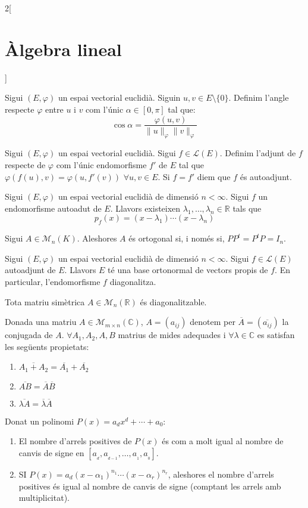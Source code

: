 \documentclass[class=article,10pt,crop=false]{standalone}
\begin{document}
\begin{multicols}{2}[\section{Àlgebra lineal}]
\begin{definition}
Sigui $(E,\varphi)$ un espai vectorial euclidià. Siguin $u,v\in E\setminus\{0\}$. Definim l'angle respecte $\varphi$ entre $u$ i $v$ com l'únic $\alpha\in[0,\pi]$ tal que: $$\cos{\alpha}=\frac{\varphi(u,v)}{\|u\|_\varphi\|v\|_\varphi}$$
\end{definition}
\begin{definition}
Sigui $(E,\varphi)$ un espai vectorial euclidià. Sigui $f\in\mathcal{L}(E)$. Definim l'adjunt de $f$ respecte de $\varphi$ com l'únic endomorfisme $f'$ de $E$ tal que $\varphi(f(u),v)=\varphi(u,f'(v))$ $\forall u,v\in E$. Si $f=f'$ diem que $f$ és autoadjunt. 
\end{definition}
\begin{lemma}
Sigui $(E,\varphi)$ un espai vectorial euclidià de dimensió $n<\infty$. Sigui $f$ un endomorfisme autoadut de $E$. Llavors existeixen $\lambda_1,\ldots,\lambda_n\in\mathbb{R}$ tals que $$p_f(x)=(x-\lambda_1 )\cdots(x-\lambda_n)$$
\end{lemma}
\begin{definition}
Sigui $A\in\mathcal{M}_n(K)$. Aleshores $A$ és ortogonal si, i només si, $PP^t=P^tP=I_n$.
\end{definition}
\begin{theorem}
Sigui $(E,\varphi)$ un espai vectorial euclidià de dimensió $n<\infty$. Sigui $f\in\mathcal{L}(E)$ autoadjunt de $E$. Llavors $E$ té una base ortonormal de vectors propis de $f$. En particular, l’endomorfisme $f$ diagonalitza.
\end{theorem}
\begin{corollary}
Tota matriu simètrica $A\in\mathcal{M}_n(\mathbb{R})$ és diagonalitzable.
\end{corollary}
\begin{definition}
Donada una matriu $A\in\mathcal{M}_{m\times n}(\mathbb{C})$, $A=(a_{ij})$ denotem per $\overline{A}=(\overline{a_{ij}})$ la conjugada de $A$. $\forall A_1,A_2,A,B$ matrius de mides adequades i $\forall\lambda\in\mathbb{C}$ es satisfan les següents propietats:
\begin{enumerate}
    \item $\overline{A_1+A_2}=\overline{
    A_1}+\overline{A_2}$
    \item $\overline{AB}=\overline{
    A}\overline{B}$
    \item $\overline{\lambda A}=\overline{\lambda}\overline{A}$
\end{enumerate}
\end{definition}
\begin{theorem}
Donat un polinomi $P(x)=a_dx^d+\cdots+a_0$:
\begin{enumerate}
    \item El nombre d'arrels positives de $P(x)$ és com a molt igual al nombre de canvis de signe en $[a_{\!_d},a_{\!_{d-1}},\ldots,a_{\!_1},a_{\!_0}]$.
    \item SI $P(x)=a_d(x-\alpha_1)^{n_1}\cdots(x-\alpha_r)^{n_r}$, aleshores el nombre d'arrels positives és igual al nombre de canvis de signe (comptant les arrels amb multiplicitat).
\end{enumerate}
\end{theorem}
\end{multicols}
\end{document}
